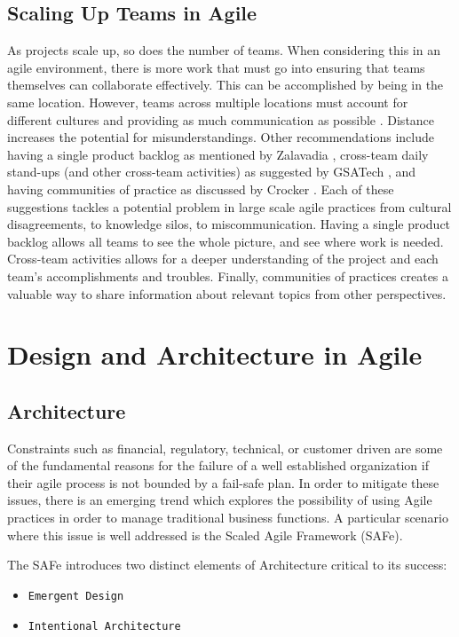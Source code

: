 \documentclass[sigplan,screen]{acmart}
\begin{document}
\subsection{Scaling Up Teams in Agile}
As projects scale up, so does the number of teams. When considering this in an agile environment, there is more work that must go into ensuring that teams themselves can collaborate effectively. This can be accomplished by being in the same location. However, teams across multiple locations must account for different cultures and providing as much communication as possible \cite{Joshi12}. Distance increases the potential for misunderstandings. Other recommendations include having a single product backlog as mentioned by Zalavadia \cite{Zalavadia16}, cross-team daily stand-ups (and other cross-team activities) as suggested by GSATech \cite{GSATech}, and having communities of practice as discussed by Crocker \cite{Crocker18}. Each of these suggestions tackles a potential problem in large scale agile practices from cultural disagreements, to knowledge silos, to miscommunication. Having a single product backlog allows all teams to see the whole picture, and see where work is needed. Cross-team activities allows for a deeper understanding of the project and each team's accomplishments and troubles. Finally, communities of practices creates a valuable way to share information about relevant topics from other perspectives.

\section{Design and Architecture in Agile}
\subsection{Architecture}

Constraints such as financial, regulatory, technical, or customer driven are some of the fundamental reasons for the failure of a well established organization if their agile process is not bounded by a fail-safe plan. In order to mitigate these issues, there is an emerging trend which explores the possibility of using Agile practices in order to manage traditional business functions.  \cite{SoftArchAgile} A particular scenario where this issue is well addressed is the Scaled Agile Framework (SAFe).

The SAFe introduces two distinct elements of Architecture critical to its success:
\begin{itemize}
\item {\verb|Emergent Design|}
\item {\verb|Intentional Architecture|}
\end{itemize}
\end{document}

